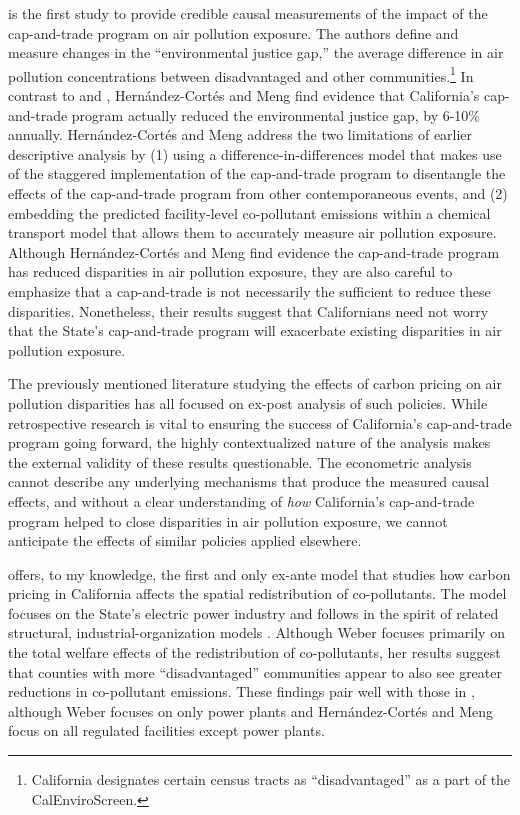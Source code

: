 \documentclass[11pt]{article}
\begin{document}
\cite{hernandez2023environmental} is the first study to provide credible causal measurements of the impact of the cap-and-trade program on air pollution exposure. The authors define and measure changes in the ``environmental justice gap,'' the average difference in air pollution concentrations between disadvantaged and other communities.\footnote{California designates certain census tracts as ``disadvantaged” as a part of the CalEnviroScreen.} In contrast to \cite{cushing2018carbon} and \cite{pastor2022up}, Hernández-Cortés and Meng find evidence that California's cap-and-trade program actually reduced the environmental justice gap, by 6-10\% annually. Hernández-Cortés and Meng address the two limitations of earlier descriptive analysis by (1) using a difference-in-differences model that makes use of the staggered implementation of the cap-and-trade program to disentangle the effects of the cap-and-trade program from other contemporaneous events, and (2) embedding the predicted facility-level co-pollutant emissions within a chemical transport model that allows them to accurately measure air pollution exposure. Although Hernández-Cortés and Meng find evidence the cap-and-trade program has reduced disparities in air pollution exposure, they are also careful to emphasize that a cap-and-trade is not necessarily the sufficient to reduce these disparities. Nonetheless, their results suggest that Californians need not worry that the State's cap-and-trade program will exacerbate existing disparities in air pollution exposure. 

The previously mentioned literature studying the effects of carbon pricing on air pollution disparities has all focused on ex-post analysis of such policies. While retrospective research is vital to ensuring the success of California's cap-and-trade program going forward, the highly contextualized nature of the analysis makes the external validity of these results questionable. The econometric analysis cannot describe any underlying mechanisms that produce the measured causal effects, and without a clear understanding of \emph{how} California's cap-and-trade program helped to close disparities in air pollution exposure, we cannot anticipate the effects of similar policies applied elsewhere. 

\cite{weber2021dynamic} offers, to my knowledge, the first and only ex-ante model that studies how carbon pricing in California affects the spatial redistribution of co-pollutants. The model focuses on the State's electric power industry and follows in the spirit of related structural, industrial-organization models \citep[e.g.,~][]{gowrisankaran2022policy, abito2022role}. Although Weber focuses primarily on the total welfare effects of the redistribution of co-pollutants, her results suggest that counties with more ``disadvantaged” communities appear to also see greater reductions in co-pollutant emissions. These findings pair well with those in \cite{hernandez2023environmental}, although Weber focuses on only power plants and Hernández-Cortés and Meng focus on all regulated facilities except power plants.
\end{document}
